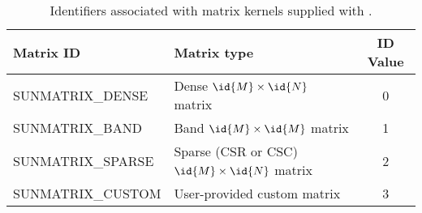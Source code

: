 \begin{table}
\centering
\caption{Identifiers associated with matrix kernels supplied with {\sundials}.}
\label{t:matrixIDs}
\medskip
\begin{tabular}{|l|l|c|}
\hline
{\bf Matrix ID} & {\bf Matrix type} & {\bf ID Value} \\
\hline
SUNMATRIX\_DENSE      & Dense $\id{M} \times \id{N}$ matrix               & 0 \\ 
SUNMATRIX\_BAND       & Band $\id{M} \times \id{M}$ matrix                & 1 \\
SUNMATRIX\_SPARSE     & Sparse (CSR or CSC) $\id{M} \times \id{N}$ matrix & 2 \\ 
SUNMATRIX\_CUSTOM     & User-provided custom matrix                       & 3 \\
\hline
\end{tabular}
\end{table}


\newlength{\ColOne}
\newlength{\ColTwo}
\setlength{\ColTwo}{\textwidth}
\addtolength{\ColTwo}{-0.5in}
\addtolength{\ColTwo}{-\ColOne}

